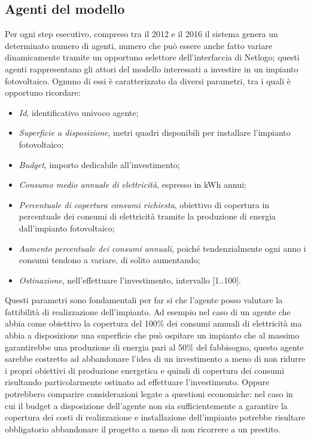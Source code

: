 \subsection{Agenti del modello}
Per ogni step esecutivo, compreso tra il 2012 e il 2016 il sistema genera un determinato numero di agenti, numero che può essere anche fatto variare dinamicamente tramite un opportuno selettore dell'interfaccia di Netlogo; questi agenti rappresentano gli attori del modello interessati a investire in un impianto fotovoltaico. Ognuno di essi è caratterizzato da diversi parametri, tra i quali è opportuno ricordare:
\begin{itemize}
\item \emph{Id}, identificativo univoco agente;
\item \emph{Superficie a disposizione}, metri quadri disponibili per installare l'impianto fotovoltaico;
\item \emph{Budget}, importo dedicabile all'investimento;
\item \emph{Consumo medio annuale di elettricità}, espresso in kWh annui;
\item \emph{Percentuale di copertura consumi richiesta}, obiettivo di copertura in percentuale dei consumi di elettricità tramite la produzione di energia dall'impianto fotovoltaico;
\item \emph{Aumento percentuale dei consumi annuali}, poiché tendenzialmente ogni anno i consumi tendono a variare, di solito aumentando;
\item \emph{Ostinazione}, nell'effettuare l'investimento, intervallo [1..100].
\end{itemize}
Questi parametri sono fondamentali per far si che l'agente posso valutare la fattibilità di realizzazione dell'impianto. Ad esempio nel caso di un agente che abbia come obiettivo la copertura del 100\% dei consumi annuali di elettricità ma abbia a disposizione una superficie che può ospitare un impianto che al massimo garantirebbe una produzione di energia pari al 50\% del fabbisogno, questo agente sarebbe costretto ad abbandonare l'idea di un investimento a meno di non ridurre i propri obiettivi di produzione energetica e quindi di copertura dei consumi risultando particolarmente ostinato ad effettuare l'investimento. Oppure potrebbero comparire considerazioni legate a questioni economiche: nel caso in cui il budget a disposizione dell'agente non sia sufficientemente a garantire la copertura dei costi di realizzazione e installazione dell'impianto potrebbe risultare obbligatorio abbandonare il progetto a meno di non ricorrere a un prestito. 

